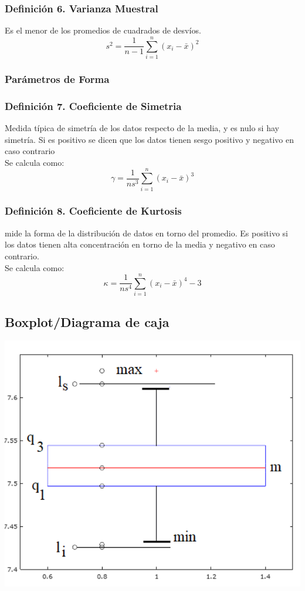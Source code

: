 \documentclass{article}
\newcommand{\sumatoria}[2]{\sum_{#1} ^{#2}}
\begin{document}
\subsubsection*{Definición 6. Varianza Muestral}
Es el menor de los promedios de cuadrados de desvíos.
\begin{equation*}
    s^2 = \frac{1}{n-1} \sumatoria{i=1}{n} (x_i - \bar{x})^2
\end{equation*}

\subsubsection{Parámetros de Forma}
\subsubsection*{Definición 7. Coeficiente de Simetria}
Medida típica de simetría de los datos respecto de la media, y es nulo si hay simetría.
Si es positivo se dicen que los datos tienen sesgo positivo y negativo en caso contrario
\\Se calcula como:
\begin{equation*}
    \gamma = \frac{1}{ns^3} \sumatoria{i=1}{n} (x_i - \bar{x})^3
\end{equation*}

\subsubsection*{Definición 8. Coeficiente de Kurtosis}
mide la forma de la distribución de datos en torno del promedio.
Es positivo si los datos tienen alta concentración en torno de la media y negativo en caso contrario.
\\Se calcula como:
\begin{equation*}
    \kappa = \frac{1}{ns^4} \sumatoria{i=1}{n} (x_i - \bar{x})^4 - 3
\end{equation*}

\subsection{Boxplot/Diagrama de caja}

\begin{center}
    \includegraphics[width=.40\textwidth]{Images/Boxplot.png}
\end{center}
\end{document}
